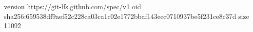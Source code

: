 version https://git-lfs.github.com/spec/v1
oid sha256:659538df9aef52c228ca03ca1c02e1772bbaf143ecc0710937be5f231ce8c37d
size 11092
